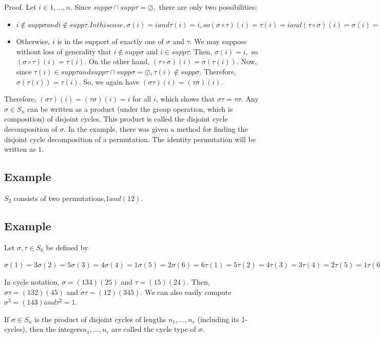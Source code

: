 Proof. Let $i\in{1, . . . , n}.$ Since $supp \sigma\cap supp \tau = \oslash,$ there are only two possibilities:
\begin{itemize}
\item $i \notin supp \sigma and i \notin supp \tau. In this case, \sigma(i) = i and \tau(i) = i, so (\sigma \circ \tau)(i) =\tau(i) = i and
(\tau \circ \sigma)(i) = \sigma(i) = i.$

\item Otherwise, $i$ is in the support of exactly one of $\sigma$ and $\tau$. We may suppose without loss of generality that
$i \notin supp \sigma$ and $i \in supp \tau.$ Then, $\sigma(i) = i,$ so $(\sigma \circ \tau)(i) = \tau(i).$ On the other hand, $(\tau \circ \sigma)(i) = \sigma(\tau(i)).$
Now, since $\tau(i) \in supp \tau and supp \tau \cap supp \sigma = \oslash, \tau(i) \notin supp \sigma.$ Therefore, $\sigma(\tau(i)) = \tau(i).$ So, we
again have $(\sigma\tau)(i) = (\tau\sigma)(i).$
\end{itemize}

Therefore, $(\sigma \tau)(i) = (\tau \sigma)(i) = i$ for all $i$, which shows that $\sigma \tau= \tau \sigma$.
Any $\sigma \in S_n$ can be written as a product (under the group operation, which is composition) of disjoint cycles.
This product is called the disjoint cycle decomposition of $\sigma.$ In the example, there was given a method for finding
the disjoint cycle decomposition of a permutation.
The identity permutation will be written as $1$.

\subsection{Example} $S_2$ consists of two permutations,$ 1 and (1 2).$

\subsection{Example} Let $\sigma, \tau \in S_6$ be defined by

$\sigma(1) = 3 \sigma(2) = 5 \sigma(3) = 4 \sigma(4) = 1 \sigma(5) = 2 \sigma(6) = 6
\tau(1) = 5 \tau(2) = 4 \tau(3) = 3 \tau(4) = 2 \tau(5) = 1 \tau(6) = 6$

In cycle notation, $\sigma = (1 3 4)(2 5)$ and $\tau = (1 5)(2 4)$. Then, $\sigma \tau= (1 3 2) (4 5)$ and $\sigma \tau= (1 2)(3 4 5)$. We
can also easily compute $\sigma^2 = (1 4 3) and \tau^2 = 1.$

 If $\sigma \in S_n$ is the product of disjoint cycles of lengths $n_1, . . . , n_r$ (including its 1-cycles),
then the integers$ n_1, . . . , n_r$ are called the cycle type of $\sigma$.

